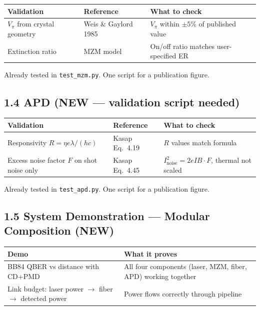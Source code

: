 \documentclass[11pt,a4paper]{article}
\begin{document}
\begin{tabularx}{\textwidth}{L{4cm} L{4cm} L{4cm}}
\toprule
Validation & Reference & What to check \\
\midrule
$V_\pi$ from crystal geometry & Weis \& Gaylord 1985
    & $V_\pi$ within $\pm5\%$ of published value \\
Extinction ratio & MZM model
    & On/off ratio matches user-specified ER \\
\bottomrule
\end{tabularx}

Already tested in \texttt{test\_mzm.py}. One script for a publication figure.

\subsection{1.4  APD (NEW --- validation script needed)}

\begin{tabularx}{\textwidth}{L{4cm} L{4cm} L{4cm}}
\toprule
Validation & Reference & What to check \\
\midrule
Responsivity $R = \eta e \lambda / (hc)$ & Kasap Eq.~4.19
    & $R$ values match formula \\
Excess noise factor $F$ on shot noise only & Kasap Eq.~4.45
    & $I_\text{noise}^2 = 2eIB\cdot F$, thermal not scaled \\
\bottomrule
\end{tabularx}

Already tested in \texttt{test\_apd.py}. One script for a publication figure.

\subsection{1.5  System Demonstration --- Modular Composition (NEW)}

\begin{tabularx}{\textwidth}{L{5cm} L{5cm}}
\toprule
Demo & What it proves \\
\midrule
BB84 QBER vs distance with CD+PMD
    & All four components (laser, MZM, fiber, APD) working together \\
Link budget: laser power $\rightarrow$ fiber $\rightarrow$ detected power
    & Power flows correctly through pipeline \\
\bottomrule
\end{tabularx}
\end{document}
